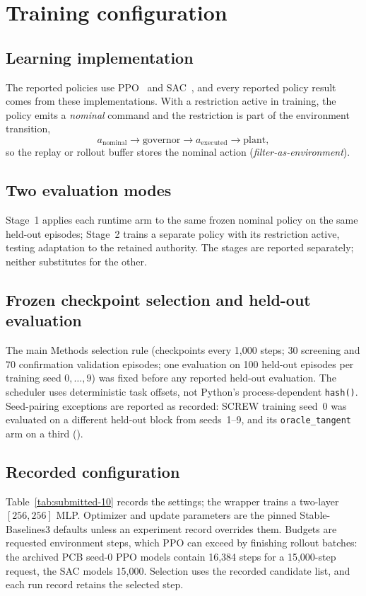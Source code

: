 \documentclass[10pt]{article}
\let\suppsection\suppname
\begin{document}
\section{Training configuration}
\subsection{Learning implementation}
The reported policies use PPO~\cite{ref31} and SAC~\cite{ref32}, and every reported policy result comes from these implementations. With a restriction active in
training, the policy emits a \emph{nominal} command and the restriction is
part of the environment transition,
\[
a_{\mathrm{nominal}}\longrightarrow\text{governor}\longrightarrow
a_{\mathrm{executed}}\longrightarrow\text{plant},
\]
so the replay or rollout buffer stores the nominal action
(\emph{filter-as-environment}).

\subsection{Two evaluation modes}
Stage~1 applies each runtime arm to the same frozen nominal policy on the same
held-out episodes; Stage~2 trains a separate policy with its restriction
active, testing adaptation to the retained authority. The stages are reported
separately; neither substitutes for the other.

\subsection{Frozen checkpoint selection and held-out evaluation}
The main Methods selection rule (checkpoints every 1,000 steps; 30 screening
and 70 confirmation validation episodes; one evaluation on 100 held-out
episodes per training seed $0,\ldots,9$) was fixed before any reported
held-out evaluation. The scheduler uses deterministic task offsets, not
Python's process-dependent \texttt{hash()}. Seed-pairing
exceptions are reported as recorded: SCREW training seed~0 was evaluated
on a different held-out block from seeds~1--9, and its
\texttt{oracle\_tangent} arm on a third (\suppsection{S9.5}).

\subsection{Recorded configuration}

Table~\ref{tab:submitted-10} records the settings; the wrapper trains a
two-layer $[256,256]$ MLP. Optimizer and update parameters are the pinned
Stable-Baselines3 defaults unless an experiment record overrides them. Budgets
are requested environment steps, which PPO can exceed by finishing rollout
batches: the archived PCB seed-0 PPO models contain 16,384 steps for a
15,000-step request, the SAC models 15,000. Selection uses the recorded
candidate list, and each run record retains the selected step.
\end{document}
